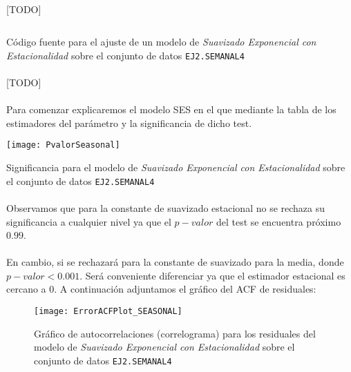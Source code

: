 \documentclass[a4paper, spanish]{article}
\begin{document}
      \paragraph{}
      [TODO]

      \begin{listing}[htb!]
        \centering
        \inputminted{SAS}{./res/code/b-01-esm-seasonal.sas}
        \caption{Código fuente para el ajuste de un modelo de \emph{Suavizado Exponencial con Estacionalidad} sobre el conjunto de datos \texttt{EJ2.SEMANAL4}}
        \label{code:b_seasonal_esm}
      \end{listing}

      \paragraph{}
      [TODO]

      \paragraph{}
      Para comenzar explicaremos el modelo SES en el que mediante la tabla de los estimadores del parámetro y la significancia de dicho test.

      \begin{table}[htb!]
        \centering
        \texttt{[image: PvalorSeasonal]}
        \caption{Significancia para el modelo de \emph{Suavizado Exponencial con Estacionalidad} sobre el conjunto de datos \texttt{EJ2.SEMANAL4}}
        \label{table:b_seasonal_significance}
      \end{table}

      \paragraph{}
      Observamos que para la constante de suavizado estacional no se rechaza su significancia a cualquier nivel ya que el $p-valor$ del test se encuentra próximo $0.99$.

      \paragraph{}
      En cambio, si se rechazará para la constante de suavizado para la media, donde $p-valor < 0.001$. Será conveniente diferenciar ya que el estimador estacional es cercano a 0. A continuación adjuntamos el gráfico del ACF de residuales:

      \begin{figure}[htb!]
        \centering
        \texttt{[image: ErrorACFPlot\_SEASONAL]}
        \caption{Gráfico de autocorrelaciones (correlograma) para los residuales del modelo de \emph{Suavizado Exponencial con Estacionalidad} sobre el conjunto de datos \texttt{EJ2.SEMANAL4}}
        \label{img:b_seasonal_residuals_correlogram}
      \end{figure}
\end{document}
